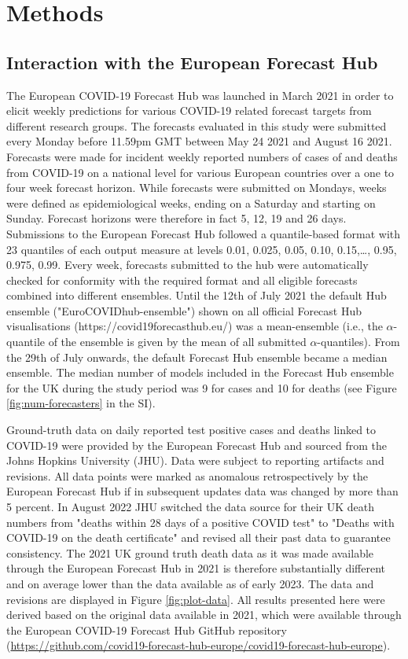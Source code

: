 \documentclass[10pt,a4paper,twocolumn]{article}
\begin{document}
\section*{Methods}

\subsection*{Interaction with the European Forecast Hub}

The European COVID-19 Forecast Hub \cite{sherrattPredictivePerformanceMultimodel2022a} was launched in March 2021 in order to elicit weekly predictions for various COVID-19 related forecast targets from different research groups. The forecasts evaluated in this study were submitted every Monday before 11.59pm GMT between May 24 2021 and August 16 2021. Forecasts were made for incident weekly reported numbers of cases of and deaths from COVID-19 on a national level for various European countries over a one to four week forecast horizon. While forecasts were submitted on Mondays, weeks were defined as epidemiological weeks, ending on a Saturday and starting on Sunday. Forecast horizons were therefore in fact 5, 12, 19 and 26 days. Submissions to the European Forecast Hub followed a quantile-based format with 23 quantiles of each output measure at levels 0.01, 0.025, 0.05, 0.10, 0.15,…, 0.95, 0.975, 0.99.
Every week, forecasts submitted to the hub were automatically checked for conformity with the required format and all eligible forecasts combined into different ensembles. Until the 12th of July 2021 the default Hub ensemble ("EuroCOVIDhub-ensemble") shown on all official Forecast Hub visualisations (https://covid19forecasthub.eu/) was a mean-ensemble (i.e., the $\alpha$-quantile of the ensemble is given by the mean of all submitted $\alpha$-quantiles). From the 29th of July onwards, the default Forecast Hub ensemble became a median ensemble. The median number of models included in the Forecast Hub ensemble for the UK during the study period was 9 for cases and 10 for deaths (see Figure \ref{fig:num-forecasters} in the SI). 

Ground-truth data on daily reported test positive cases and deaths linked to COVID-19 were provided by the European Forecast Hub and sourced from the Johns Hopkins University (JHU). Data were subject to reporting artifacts and revisions. All data points were marked as anomalous retrospectively by the European Forecast Hub if in subsequent updates data was changed by more than 5 percent. In August 2022 JHU switched the data source for their UK death numbers from "deaths within 28 days of a positive COVID test" to "Deaths with COVID-19 on the death certificate" and revised all their past data to guarantee consistency. The 2021 UK ground truth death data as it was made available through the European Forecast Hub in 2021 is therefore substantially different and on average lower than the data available as of early 2023. The data and revisions are displayed in Figure \ref{fig:plot-data}. All results presented here were derived based on the original data available in 2021, which were available through the European COVID-19 Forecast Hub GitHub repository (\url{https://github.com/covid19-forecast-hub-europe/covid19-forecast-hub-europe}). 
\end{document}
